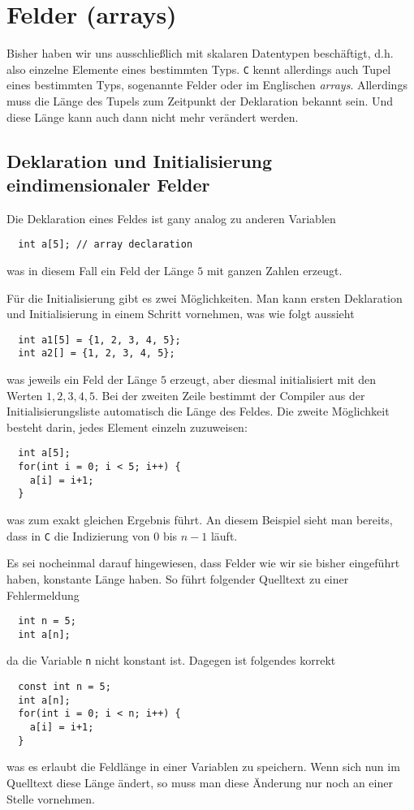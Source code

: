 \section{Felder (arrays)}

Bisher haben wir uns ausschließlich mit skalaren Datentypen beschäftigt, d.h. also einzelne Elemente eines bestimmten Typs.
\texttt{C} kennt allerdings auch Tupel eines bestimmten Typs, sogenannte Felder oder im Englischen \emph{arrays}.
Allerdings muss die Länge des Tupels zum Zeitpunkt der Deklaration bekannt sein.
Und diese Länge kann auch dann nicht mehr verändert werden.

\subsection{Deklaration und Initialisierung eindimensionaler Felder}

Die Deklaration eines Feldes ist gany analog zu anderen Variablen
\begin{lstlisting}
  int a[5]; // array declaration
\end{lstlisting}
was in diesem Fall ein Feld der Länge $5$ mit ganzen Zahlen erzeugt.

Für die Initialisierung gibt es zwei Möglichkeiten.
Man kann ersten Deklaration und Initialisierung in einem Schritt vornehmen, was wie folgt aussieht
\begin{lstlisting}
  int a1[5] = {1, 2, 3, 4, 5};
  int a2[] = {1, 2, 3, 4, 5};
\end{lstlisting}
was jeweils ein Feld der Länge $5$ erzeugt, aber diesmal initialisiert mit den Werten $1,2,3,4,5$.
Bei der zweiten Zeile bestimmt der Compiler aus der Initialisierungsliste automatisch die Länge des Feldes.
Die zweite Möglichkeit besteht darin, jedes Element einzeln zuzuweisen:
\begin{lstlisting}
  int a[5];
  for(int i = 0; i < 5; i++) {
    a[i] = i+1;
  }
\end{lstlisting}
was zum exakt gleichen Ergebnis führt.
An diesem Beispiel sieht man bereits, dass in \texttt{C} die Indizierung von $0$ bis $n-1$ läuft.

Es sei nocheinmal darauf hingewiesen, dass Felder wie wir sie bisher eingeführt haben, konstante Länge haben.
So führt folgender Quelltext zu einer Fehlermeldung
\begin{lstlisting}
  int n = 5;
  int a[n];
\end{lstlisting}
da die Variable \texttt{n} nicht konstant ist.
Dagegen ist folgendes korrekt
\begin{lstlisting}
  const int n = 5;
  int a[n];
  for(int i = 0; i < n; i++) {
    a[i] = i+1;
  }
\end{lstlisting}
was es erlaubt die Feldlänge in einer Variablen zu speichern.
Wenn sich nun im Quelltext diese Länge ändert, so muss man diese Änderung nur noch an einer Stelle vornehmen.

